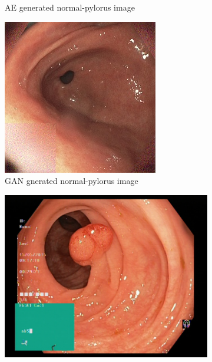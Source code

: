 \begin{figure}[h]
\begin{subfigure}[t]{\myfigsizethree}
            \caption{AE generated normal-pylorus image}    
            \label{fig:np_AE_both1}
        \end{subfigure}
        \qquad
        \begin{subfigure}[t]{\myfigsizethree}  
            \centering 
            \includegraphics[width=\textwidth]{experiments/figures/both/NPGAN.jpg}
            \caption{GAN gnerated normal-pylorus image}    
            \label{fig:np_GAN_both1}
        \end{subfigure}
        \qquad\vfill%
        \begin{subfigure}[t]{\myfigsizethree}   
            \centering 
            \includegraphics[height=\textwidth ,width=\textwidth]{experiments/figures/both/PORIG.jpg}

\end{subfigure}
\end{figure}
